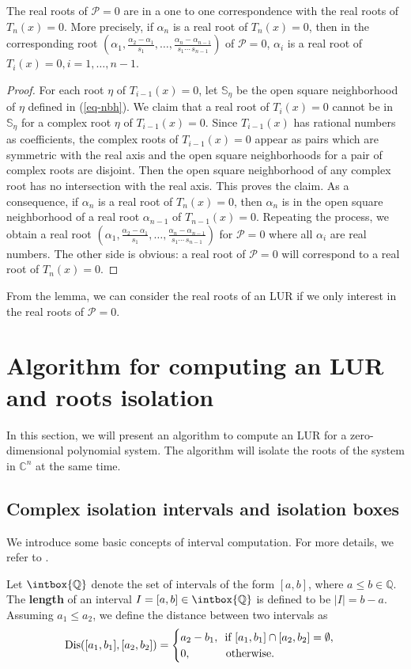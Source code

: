 \documentclass[amsthm]{JSC_LaTex_2007_Mar_12/elsart}
\def\bref#1{(\ref{#1})}
\def\Q{{\mathbb{Q}}}
\def\PS{ {\mathcal{P}} }
\def\Dis{\hbox{\rm{Dis}}}
\begin{document}
\begin{cor}
The real roots of $\PS=0$ are in  a one to one correspondence with
the real roots of $T_n(x)=0$. More precisely, if $\alpha_n$ is a
real root of $T_n(x)=0$, then in the corresponding root
$(\alpha_1,\frac{\alpha_2-\alpha_1}{s_1},\ldots,\frac{\alpha_n-\alpha_{n-1}}{s_1\cdots\,s_{n-1}})$
of $\PS=0$, $\alpha_i$ is a real root of $T_i(x)=0,i=1,\ldots,n-1$.
\end{cor}
\begin{proof}
For each root $\eta$ of $T_{i-1}(x)=0$, let  $\mathbb{S}_{\eta}$ be
the open square neighborhood of $\eta$ defined in \bref{eq-nbh}.
We claim that a real root of $T_i(x)=0$ cannot be in
$\mathbb{S}_{\eta}$ for a complex root $\eta$ of $T_{i-1}(x)=0$.
Since $T_{i-1}(x)$ has rational numbers as coefficients, the complex
roots of $T_{i-1}(x)=0$ appear as pairs which are symmetric with the
real axis and the open square neighborhoods for a pair of complex
roots are disjoint. Then the open square neighborhood of any complex
root has no intersection with the real axis. This proves the claim.
As a consequence, if $\alpha_n$ is a real root of $T_n(x)=0$, then
$\alpha_n$ is in the open square neighborhood of a real root
$\alpha_{n-1}$ of $T_{n-1}(x)=0$. Repeating the process, we obtain a
real root
$(\alpha_1,\frac{\alpha_2-\alpha_1}{s_1},\ldots,\frac{\alpha_n-\alpha_{n-1}}{s_1\cdots\,s_{n-1}})$
for $\PS=0$ where all $\alpha_i$ are real numbers.
The other side is obvious: a real root of $\PS=0$ will correspond to
a real root of $T_n(x)=0$.
\end{proof}
From the lemma, we can consider the real roots of an LUR if we only
interest in the real roots of $\PS=0$.


\section{Algorithm for computing an LUR and roots isolation}
In this section, we will present an algorithm to compute an LUR for
a zero-dimensional polynomial system. The algorithm will isolate the
roots of the system in $\mathbb{C}^n$ at the same time.


\subsection{Complex isolation intervals and isolation boxes}
We introduce some basic concepts of interval computation. For more
details, we refer to \cite{intervalbook}.

Let $\intbox \Q$ denote the set of intervals of the form $[a,b]$,
where $a\le b\in \Q$. The {\bf length} of an interval $I=
[a,b]\in\intbox \Q$ is defined to be $|I| = b-a$.
Assuming $a_1\le a_2$, we define the distance between two intervals
as
$$\Dis([a_1,b_1],[a_2,b_2])=
\begin{cases}
a_2-b_1, \,\hbox{ if } [a_1,b_1]\cap[a_2,b_2]=\emptyset,\\
0, \hspace{1cm}\hbox{        otherwise}.
\end{cases}
$$
\end{document}
